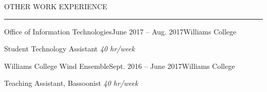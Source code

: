 \documentclass{resume} %
\renewenvironment{rSection}[1]{
	\sectionskip
	\textcolor{RoyalPurple}{\MakeUppercase{#1}}
	\sectionlineskip
	\hrule
	\begin{list}{}{
			\setlength{\leftmargin}{1.5em}
		}
		\item[]
	}{
	\end{list}
}
\begin{document}


\begin{rSection}{Other Work Experience} \itemsep -2pt
	\begin{rSubsection}{Office of Information Technologies}{June 2017 -- Aug. 2017}{}{Williams College}{}
		\item {Student Technology Assistant} \hfill {\em 40 hr/week}
	\end{rSubsection}
	\begin{rSubsection}{Williams College Wind Ensemble}{Sept. 2016 -- June 2017}{}{Williams College}{}
		\item {Teaching Assistant, Bassoonist} \hfill {\em 40 hr/week}
	\end{rSubsection}
	
\end{rSection}

\end{document}
